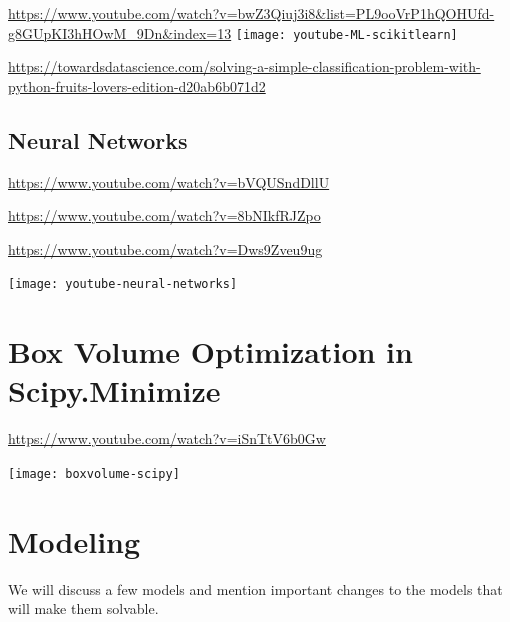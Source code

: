 \documentclass[../open-optimization/open-optimization.tex]{subfiles}
\begin{document}
\url{https://www.youtube.com/watch?v=bwZ3Qiuj3i8&list=PL9ooVrP1hQOHUfd-g8GUpKI3hHOwM_9Dn&index=13}
\texttt{[image: youtube-ML-scikitlearn]}


\url{https://towardsdatascience.com/solving-a-simple-classification-problem-with-python-fruits-lovers-edition-d20ab6b071d2}

\subsection{Neural Networks}



\url{https://www.youtube.com/watch?v=bVQUSndDllU}

\url{https://www.youtube.com/watch?v=8bNIkfRJZpo}

\url{https://www.youtube.com/watch?v=Dws9Zveu9ug}

\texttt{[image: youtube-neural-networks]}


\section{Box Volume Optimization in Scipy.Minimize}
\url{https://www.youtube.com/watch?v=iSnTtV6b0Gw}

\texttt{[image: boxvolume-scipy]}
\section{Modeling}
We will discuss a few models and mention important changes to the models that will make them solvable.  
\end{document}

